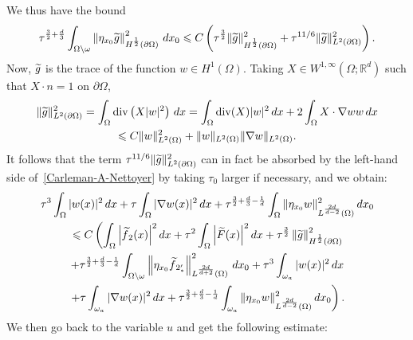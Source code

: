 \documentclass[10pt]{amsart}
\theoremstyle{definition}\newtheorem{defi}[theo]{Definition}\newtheorem{rema}[theo]{Remark}\newtheorem{exam}[theo]{Example}\newtheorem{exem}[theo]{Example}\newtheorem{nota}[theo]{Notation}
\newcommand*\R{\mathbb{R}}
\newcommand{\norm}[1]{\left\Vert#1\right\Vert}
\renewcommand{\leq}{\leqslant}
\renewcommand{\tilde}{\widetilde}
\renewcommand{\div}{\operatorname{div}}
\let\oldtilde\tilde
\renewcommand*{\tilde}[1]{\mathchoice{\widetilde{#1}}{\widetilde{#1}}{\oldtilde{#1}}{\oldtilde{#1}}}
\begin{document}
We thus have the bound
\begin{equation*}
\tau^{\frac{3}{2}+\frac{d}{3}} \int_{\Omega \setminus \omega} \norm{ \eta_{x_0} \tilde g}_{H^{\frac{1}{2}}(\partial \Omega)}^2 \, dx_0
\leq C\left(
\tau^{\frac{3}{2}} \| \tilde g \|_{H^{\frac{1}{2}}(\partial \Omega)}^2 + \tau^{11/6} \| \tilde g\|_{L^2(\partial \Omega)}^2\right).
\end{equation*}
Now, $\tilde g$ is the trace of the function $w \in H^1(\Omega)$. Taking $X \in W^{1,\infty}(\Omega; \R^d)$ such that $X \cdot n = 1$ on $\partial \Omega$,
\begin{multline*}
\| \tilde g\|_{L^2(\partial \Omega)}^2 =
\int_{\Omega} \div \left(X |w|^2\right) \, dx =
\int_{\Omega} \div(X) |w|^2 \, dx +2 \int_\Omega X \cdot \nabla w w \, dx \\
\leq C \| w\|_{L^2(\Omega)}^2 + \|w \|_{L^2(\Omega)} \| \nabla w \|_{L^2(\Omega)}.
\end{multline*}
It follows that the term $\tau^{11/6} \| \tilde g\|_{L^2(\partial \Omega)}^2$ can in fact be absorbed by the left-hand side of~\eqref{Carleman-A-Nettoyer} by taking $\tau_0$ larger if necessary, and we obtain:
\begin{multline*}
\tau^3 \int_{\Omega} |w(x)|^2 \, dx +
\tau \int_{\Omega} |\nabla w(x)|^2 \, dx +
\tau^{\frac{3}{2}+\frac{d}{3}-\frac{1}{d}} \int_{\Omega} \| \eta_{x_0} w \|_{L^{\frac{2d}{d-2}}(\Omega)}^2 \, dx_0
\\
\leq  C 
\left(
\int_\Omega  \left|\tilde f_2(x)\right|^2 dx+
\tau^2  \int_\Omega \left|\tilde F(x)\right|^2 dx  + 
\tau^{\frac{3}{2}} \norm{\tilde g }_{H^{\frac{1}{2}}(\partial \Omega)}^2\!\right.
\\
\left.+
\tau^{\frac{3}{2}+\frac{d}{3}-\frac{1}{d}} \int_{\Omega \setminus \omega} \norm{\eta_{x_0} \tilde f_{2_*'}}_{L^{\frac{2d}{d+2}}(\Omega)}^2 \, dx_0
 +
\tau^{3} \int_{\omega_a} |w(x)|^2 \, dx 
\right.
\\
\left.
+
\tau \int_{\omega_a} |\nabla w(x)|^2 \, dx +
\tau^{\frac{3}{2}+\frac{d}{3}-\frac{1}{d}} \int_{ \omega_a} \| \eta_{x_0} w \|_{L^{\frac{2d}{d-2}}(\Omega)}^2 \, dx_0
\right).
\end{multline*}
We then go back to the variable $u$ and get the following estimate:
\end{document}
